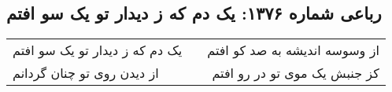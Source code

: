 \begin{center}
\section*{رباعی شماره ۱۳۷۶: یک دم که ز دیدار تو یک سو افتم}
\label{sec:1376}
\begin{longtable}{l p{0.5cm} r}
یک دم که ز دیدار تو یک سو افتم
&&
از وسوسه اندیشه به صد کو افتم
\\
از دیدن روی تو چنان گردانم
&&
کز جنبش یک موی تو در رو افتم
\\
\end{longtable}
\end{center}

